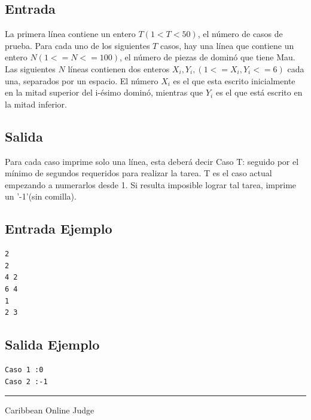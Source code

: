 \documentclass[letter,10pt]{article}
\newcommand{\lyxaddress}[1]{
\par {\raggedright #1
\vspace{1.4em}
\noindent\par}
}
\begin{document}
\subsection*{Entrada}

La primera línea contiene un entero $T(1<T<50)$, el número de casos de prueba.
Para cada uno de los siguientes $T$ casos, hay una línea que contiene un entero $N(1<=N<=100)$, el número de piezas de dominó que tiene Mau. Las siguientes $N$ líneas contienen dos enteros $X_{i},Y_{i},(1<=X_{i},Y_{i}<=6)$ cada una, separados por un espacio. El número $X_{i}$ es el que esta escrito inicialmente en la mitad superior del i-ésimo dominó, mientras que $Y_{i}$ es el que está escrito en la mitad inferior. 


\subsection*{Salida}

Para cada caso imprime solo una línea, esta deberá decir Caso T: seguido por el mínimo de segundos requeridos para realizar la tarea. T es el caso actual empezando a numerarlos desde 1. Si resulta imposible lograr tal tarea, imprime un '-1'(sin comilla).

\subsection*{Entrada Ejemplo}
\begin{verbatim}
2
2
4 2
6 4
1
2 3
\end{verbatim}

\subsection*{Salida Ejemplo}

\begin{verbatim}
Caso 1 :0
Caso 2 :-1
\end{verbatim}

\noindent \rule[0.5ex]{1\columnwidth}{1pt}


\lyxaddress{Caribbean Online Judge}
\end{document}
